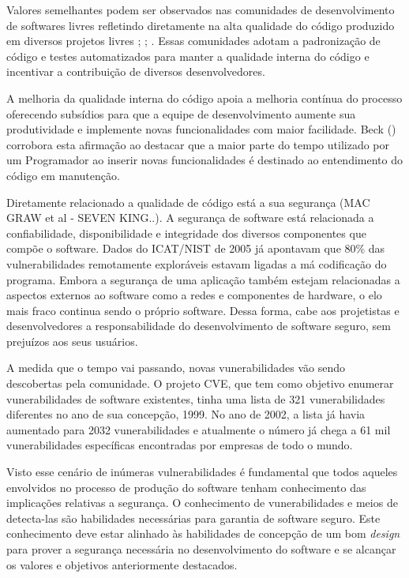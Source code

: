 %

Valores semelhantes podem ser observados nas comunidades de desenvolvimento de softwares livres refletindo diretamente na alta qualidade do código produzido em diversos projetos livres \cite{schmidt2001}; \cite{halloran2002}; \cite{michlmayr2003}. Essas comunidades adotam a padronização de código e testes automatizados para manter a qualidade interna do código e incentivar a contribuição de diversos desenvolvedores.

%

A melhoria da qualidade interna do código apoia a melhoria contínua do processo oferecendo subsídios para que a equipe de desenvolvimento aumente sua produtividade e implemente novas funcionalidades com maior facilidade. Beck (\citeyear{beck2007}) corrobora esta afirmação ao destacar que a maior parte do tempo utilizado por um Programador ao inserir novas funcionalidades é destinado ao entendimento do código em manutenção. 

%

Diretamente relacionado a qualidade de código está a sua segurança (MAC GRAW et al  - SEVEN KING..). A segurança de software está relacionada a confiabilidade, disponibilidade e integridade dos diversos componentes que compõe o software. Dados do ICAT/NIST de 2005 já apontavam que 80\% das vulnerabilidades remotamente exploráveis estavam ligadas a má codificação do programa. Embora a segurança de uma aplicação também estejam relacionadas a aspectos externos ao software como a redes e componentes de hardware, o elo mais fraco continua sendo o próprio software. Dessa forma, cabe aos projetistas e desenvolvedores a responsabilidade do desenvolvimento de software seguro, sem prejuízos aos seus usuários.

%

A medida que o tempo vai passando, novas vunerabilidades vão sendo descobertas pela comunidade. O projeto CVE, que tem como objetivo enumerar vunerabilidades de software existentes, tinha uma lista de 321 vunerabilidades diferentes no ano de sua concepção, 1999. No ano de 2002, a lista já havia aumentado para 2032 vunerabilidades e atualmente o número já chega a 61 mil vunerabilidades específicas encontradas por empresas de todo o mundo.

%

Visto esse cenário de inúmeras vulnerabilidades é fundamental que todos aqueles envolvidos no processo de produção do software tenham conhecimento das implicações relativas a segurança. O conhecimento de vunerabilidades e meios de detecta-las são habilidades necessárias para garantia de software seguro. Este conhecimento deve estar alinhado às habilidades de concepção de um bom \emph{design} para prover a segurança necessária no desenvolvimento do software e se alcançar os valores e objetivos anteriormente destacados.

